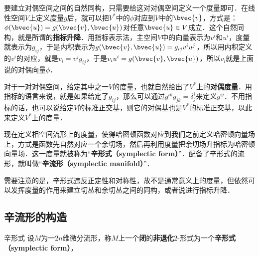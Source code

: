 要建立对偶空间之间的自然同构，只需要给这对对偶空间定义一个度量即可．在线性空间$V$上定义度量$g$后，就可以把$V^*$中的$\phi$对应到$V$中的$\bvec{v}$，方式是：$\phi(\bvec{u})=g(\bvec{v}, \bvec{u})$对任意$\bvec{u}\in V$成立．这个自然同构，就是所谓的\textbf{指标升降}．用指标表示法，主空间$V$中的向量表示为$v^i$和$u^i$，度量就表示为$g_{ij}$，于是内积表示为$g(\bvec{v}, \bvec{u})=g_{ij}v^iu^j$，所以用内积定义的$v^i$的对应，就是$v_i=v^jg_{ij}$，于是$v_iu^i=g(\bvec{v}, \bvec{u})$，所以$v_i$就是上面说的对偶向量$\phi$．

对于一对对偶空间，给定其中之一$V$的度量，也就自然给出了$V^*$上的\textbf{对偶度量}．用指标的语言来说，就是如果给定了$g_{ij}$，那么可以通过$g^{ik}g_{jk}=\delta^i_j$来定义$g^{ij}$．不用指标的话，也可以说给定$V$的标准正交基，则它的对偶基也是$V^*$的标准正交基，以此来定义$V^*$上的度量．

现在定义相空间流形上的度量，使得哈密顿函数对应到我们之前定义哈密顿向量场上，方式是函数先自然对应一个余切场，然后再利用度量把余切场升指标为哈密顿向量场．这一度量就被称为“\textbf{辛形式（symplectic form）}”．配备了辛形式的流形，就叫做“\textbf{辛流形（symplectic manifold）}”．

需要注意的是，辛形式违反正定性和对称性，故不是通常意义上的度量，但依然可以发挥度量的作用来建立切丛和余切丛之间的同构，或者说进行指标升降．


\subsection{辛流形的构造}




\begin{definition}{辛形式}
设$M$为一$2n$维微分流形，称$M$上一个\textbf{闭}的\textbf{非退化}$2$-形式为一个\textbf{辛形式（symplectic form）}，
\end{definition}


























